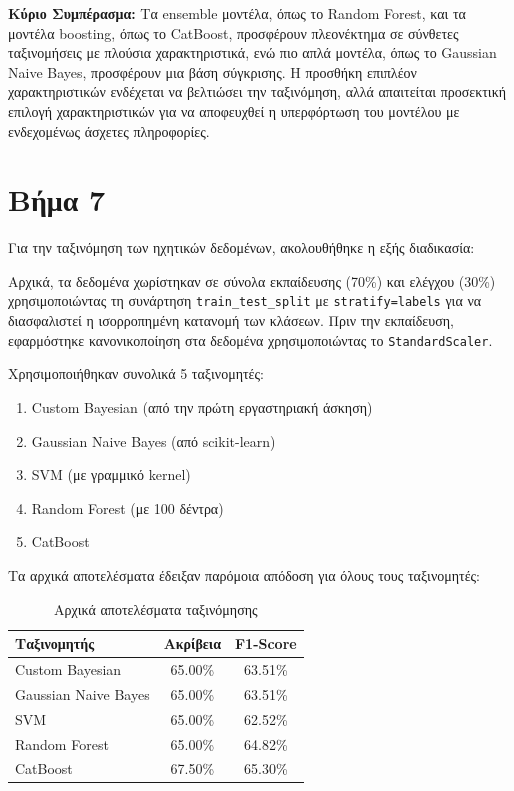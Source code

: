 \documentclass[a4paper,12pt]{article}
\begin{document}
\textbf{Κύριο Συμπέρασμα:} Τα ensemble μοντέλα, όπως το Random Forest, και τα μοντέλα boosting, όπως το CatBoost, προσφέρουν πλεονέκτημα σε σύνθετες ταξινομήσεις με πλούσια χαρακτηριστικά, ενώ πιο απλά μοντέλα, όπως το Gaussian Naive Bayes, προσφέρουν μια βάση σύγκρισης. Η προσθήκη επιπλέον χαρακτηριστικών ενδέχεται να βελτιώσει την ταξινόμηση, αλλά απαιτείται προσεκτική επιλογή χαρακτηριστικών για να αποφευχθεί η υπερφόρτωση του μοντέλου με ενδεχομένως άσχετες πληροφορίες.


\section*{Βήμα 7}

Για την ταξινόμηση των ηχητικών δεδομένων, ακολουθήθηκε η εξής διαδικασία:

Αρχικά, τα δεδομένα χωρίστηκαν σε σύνολα εκπαίδευσης (70\%) και ελέγχου (30\%) 
χρησιμοποιώντας τη συνάρτηση \texttt{train\_test\_split} με \texttt{stratify=labels} 
για να διασφαλιστεί η ισορροπημένη κατανομή των κλάσεων. Πριν την εκπαίδευση, 
εφαρμόστηκε κανονικοποίηση στα δεδομένα χρησιμοποιώντας το \texttt{StandardScaler}.

Χρησιμοποιήθηκαν συνολικά 5 ταξινομητές:
\begin{enumerate}
   \item Custom Bayesian (από την πρώτη εργαστηριακή άσκηση)
   \item Gaussian Naive Bayes (από scikit-learn)
   \item SVM (με γραμμικό kernel)
   \item Random Forest (με 100 δέντρα)
   \item CatBoost
\end{enumerate}

Τα αρχικά αποτελέσματα έδειξαν παρόμοια απόδοση για όλους τους ταξινομητές:

\begin{table}[h]
\centering
\begin{tabular}{lcc}
\hline
\textbf{Ταξινομητής} & \textbf{Ακρίβεια} & \textbf{F1-Score} \\
\hline
Custom Bayesian & 65.00\% & 63.51\% \\
Gaussian Naive Bayes & 65.00\% & 63.51\% \\
SVM & 65.00\% & 62.52\% \\
Random Forest & 65.00\% & 64.82\% \\
CatBoost & 67.50\% & 65.30\% \\
\hline
\end{tabular}
\caption{Αρχικά αποτελέσματα ταξινόμησης}
\end{table}
\end{document}
